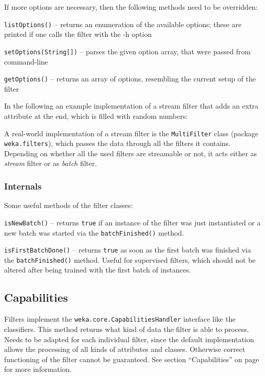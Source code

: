 If more options are necessary, then the following methods need to be overridden:
\begin{tight_itemize}
  \item \texttt{listOptions()} -- returns an enumeration of the available
options; these are printed if one calls the filter with the -h option
  \item \texttt{setOptions(String[])} -- parses the given option array,
that were passed from command-line
  \item \texttt{getOptions()} -- returns an array of options, resembling the
current setup of the filter
\end{tight_itemize}

\newpage
In the following an example implementation of a stream filter that adds an extra
attribute at the end, which is filled with random numbers:

{\footnotesize }

\noindent A real-world implementation of a stream filter is the
\texttt{MultiFilter} class (package \texttt{weka.filters}), which passes the
data through all the filters it contains. Depending on whether all the used
filters are streamable or not, it acts either as \textit{stream} filter or as
\textit{batch} filter.

\newpage
\subsubsection{Internals}
Some useful methods of the filter classes:
\begin{tight_itemize}
  \item \texttt{isNewBatch()} -- returns \texttt{true} if an instance of the
filter was just instantiated or a new batch was started via the
\texttt{batchFinished()} method.
  \item \texttt{isFirstBatchDone()} -- returns \texttt{true} as soon as the
first batch was finished via the \texttt{batchFinished()} method. Useful for
supervised filters, which should not be altered after being trained with the
first batch of instances.
\end{tight_itemize}

\subsection{Capabilities}
\label{filter_capabilities}
Filters implement the \texttt{weka.core.CapabilitiesHandler} interface like the
classifiers. This method returns what kind of data the filter is able to
process. Needs to be adapted for each individual filter, since the default
implementation allows the processing of all kinds of attributes and classes.
Otherwise correct functioning of the filter cannot be guaranteed. See section
``Capabilities'' on page \pageref{classifier_capabilities} for more information.

